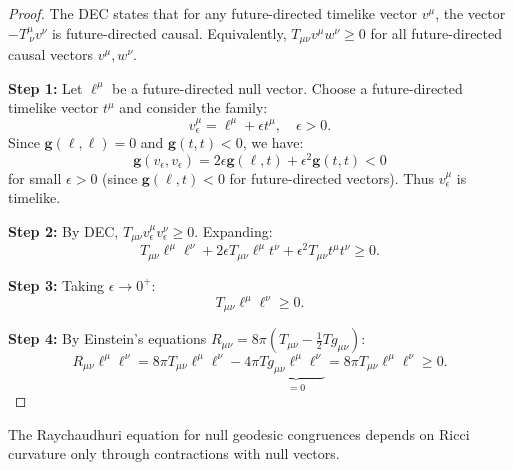 \begin{proof}
The DEC states that for any future-directed timelike vector $v^\mu$, the vector $-T^\mu_{\ \nu}v^\nu$ is future-directed causal. Equivalently, $T_{\mu\nu}v^\mu w^\nu \geq 0$ for all future-directed causal vectors $v^\mu, w^\nu$.

\textbf{Step 1:} Let $\ell^\mu$ be a future-directed null vector. Choose a future-directed timelike vector $t^\mu$ and consider the family:
\begin{equation}
    v^\mu_\epsilon = \ell^\mu + \epsilon t^\mu, \quad \epsilon > 0.
\end{equation}
Since $\mathbf{g}(\ell, \ell) = 0$ and $\mathbf{g}(t, t) < 0$, we have:
\begin{equation}
    \mathbf{g}(v_\epsilon, v_\epsilon) = 2\epsilon \mathbf{g}(\ell, t) + \epsilon^2 \mathbf{g}(t, t) < 0
\end{equation}
for small $\epsilon > 0$ (since $\mathbf{g}(\ell, t) < 0$ for future-directed vectors). Thus $v_\epsilon^\mu$ is timelike.

\textbf{Step 2:} By DEC, $T_{\mu\nu}v_\epsilon^\mu v_\epsilon^\nu \geq 0$. Expanding:
\begin{equation}
    T_{\mu\nu}\ell^\mu\ell^\nu + 2\epsilon T_{\mu\nu}\ell^\mu t^\nu + \epsilon^2 T_{\mu\nu}t^\mu t^\nu \geq 0.
\end{equation}

\textbf{Step 3:} Taking $\epsilon \to 0^+$:
\begin{equation}
    T_{\mu\nu}\ell^\mu\ell^\nu \geq 0.
\end{equation}

\textbf{Step 4:} By Einstein's equations $R_{\mu\nu} = 8\pi(T_{\mu\nu} - \frac{1}{2}Tg_{\mu\nu})$:
\begin{equation}
    R_{\mu\nu}\ell^\mu\ell^\nu = 8\pi T_{\mu\nu}\ell^\mu\ell^\nu - 4\pi T \underbrace{g_{\mu\nu}\ell^\mu\ell^\nu}_{=0} = 8\pi T_{\mu\nu}\ell^\mu\ell^\nu \geq 0.
\end{equation}
\end{proof}

\begin{theorem}\label{thm:NullRicci}
The Raychaudhuri equation for null geodesic congruences depends on Ricci curvature only through contractions with null vectors.
\end{theorem}

